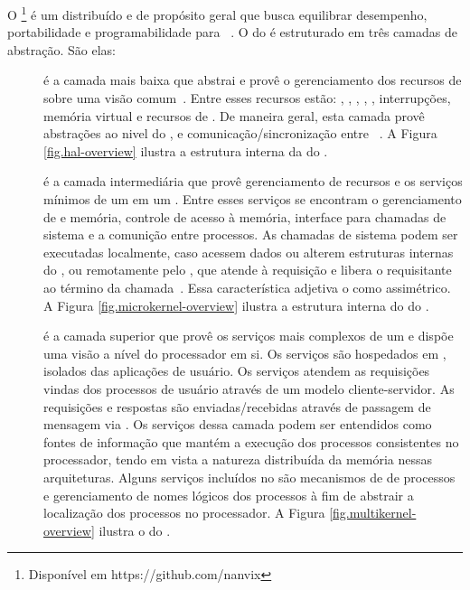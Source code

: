 O \nanvix\footnote{Disponível em https://github.com/nanvix} é um \os distribuído e de propósito geral que busca equilibrar desempenho, portabilidade e programabilidade para \lws~\cite{penna:sbesc19}. O  do \nanvix é estruturado em três camadas de abstração. São elas:
\begin{description}
    \item [\nanvix \hal]
         é a camada mais baixa que abstrai e provê o gerenciamento dos recursos de \hardware sobre uma visão comum~\cite{penna:hal}. Entre esses recursos estão: \cores, \tlbs, \cache, \mmu, \noc, interrupções, memória virtual e recursos de \io. De maneira geral, esta camada provê abstrações ao nivel do \core, \cluster e comunicação/sincronização entre \clusters~\cite{penna:thesis}. A Figura \ref{fig.hal-overview} ilustra a estrutura interna da \hal do \nanvix.
    \item [\nanvix \Microkernel]
        é a camada intermediária que provê gerenciamento de recursos e os serviços mínimos de um \os em um \cluster. Entre esses serviços se encontram o gerenciamento de \threads e memória, controle de acesso à memória, interface para chamadas de sistema e a comunição entre processos. As chamadas de sistema podem ser executadas localmente, caso acessem dados \rdo ou alterem estruturas internas do \core, ou remotamente pelo \mcore, que atende à requisição e libera o \score requisitante ao término da chamada~\cite{penna:thesis}. Essa característica adjetiva o \microkernel como assimétrico. A Figura \ref{fig.microkernel-overview} ilustra a estrutura interna do \microkernel do \nanvix.
    \item [\nanvix \Multikernel]
        é a camada superior que provê os serviços mais complexos de um \os e dispõe uma visão a nível do processador em si. Os serviços são hospedados em \ioclusters, \ie isolados das aplicações de usuário. Os serviços atendem as requisições vindas dos processos de usuário através de um modelo cliente-servidor. As requisições e respostas são enviadas/recebidas através de passagem de mensagem via \noc. Os serviços dessa camada podem ser entendidos como fontes de informação que mantém a execução dos processos consistentes no processador, tendo em vista a natureza distribuída da memória nessas arquiteturas. Alguns serviços incluídos no \nanvix são mecanismos de \spawn de processos e gerenciamento de nomes lógicos dos processos à fim de abstrair a localização dos processos no processador. A Figura \ref{fig.multikernel-overview} ilustra o \multikernel do \nanvix.
\end{description}

